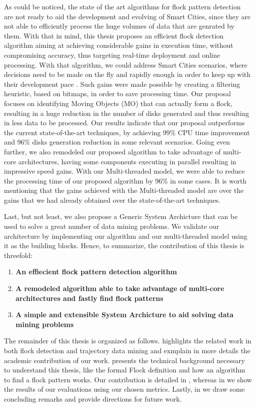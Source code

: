 As could be noticed, the state of the art algorithms for flock pattern detection are not ready to aid the development
and evolving of Smart Cities, since they are not able to efficiently process the huge volumes of data that are genrated
by them. With that in mind, this thesis proposes an efficient flock detection algorithm aiming at achieving considerable
gains in execution time, without compromising accuracy, thus targeting real-time deployment and online processing. With
that algorithm, we could address Smart Cities scenarios, where decisions need to be made on the fly and rapidly enough
in order to keep up with their development pace \citep{ieeesmartcities}\citep{springersmartcities}. Such gains were made
possible by creating a filtering heuristic, based on bitmaps, in order to save processing time. Our proposal focuses on
identifying Moving Objects (MO) that can actually form a flock, resulting in a huge reduction in the number of disks
generated and thus resulting in less data to be processed. Our results indicate that our proposal outperforms the
current state-of-the-art techniques, by achieving 99\% CPU time improvement and 96\% disks generation reduction in some
relevant scenarios. Going even further, we also remodeled our proposed algorithm to take advantage of multi-core
architectures, having some components executing in parallel resulting in impressive speed gains. With our Multi-threaded
model, we were able to reduce the processing time of our proposed algorithm by 96\% in some cases. It is worth
mentioning that the gains achieved with the Multi-threaded model are over the gains that we had already obtained over
the state-of-the-art techniques.

Last, but not least, we also propose a Generic System Archicture that can be used to solve a great number of data mining
problems. We validate our architecture by implementing our algorithm and our multi-threaded model using it as the
building blocks. Hence, to summarize, the contribution of this thesis is threefold:

\begin{enumerate}
    \item \textbf{An effiecient flock pattern detection algorithm}
    \item \textbf{A remodeled algorithm able to take advantage of multi-core architectures and fastly find flock
        patterns}
    \item \textbf{A simple and extensible System Archicture to aid solving data mining problems}
\end{enumerate}

The remainder of this thesis is organized as follows.  highlights the related work in both flock
detection and trajectory data mining and exmplain in more details the academic contribution of our work.
 presents the technical background necessary to understand this thesis, like the formal
Flock definition and how an algorithm to find a flock pattern works. Our contribution is detailed in
, whereas in  we show the results of our evaluations using our chosen
metrics. Lastly, in  we draw some concluding remarks and provide directions for future work.
